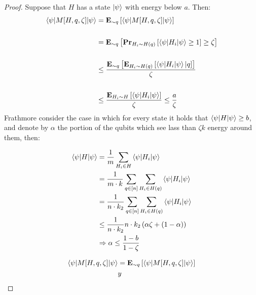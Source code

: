 \documentclass[manuscript,screen,review]{acmart}
\begin{document}
\begin{proof}
  Suppose that $H$ has a state $\ket{\psi}$ with energy below $a$. Then:  
  \begin{equation*}
    \begin{split}
      \braket{\psi|M[H,q,\zeta]|\psi} & =  \exppm{ \braket{\psi|M[H,q,\zeta]|\psi} }{\sim q} \\ 
      & \\
      & =\exppm{\prbm{ \braket{\psi|H_{i}|\psi} \ge 1 }{H_{i}\sim H(q)} \ge \zeta }{\sim q} \\
      & \\ 
      & \le  \frac{ \exppm{ \exppm{ \braket{\psi|H_{i}|\psi} | q }{ H_{i} \sim H(q)} }{ \sim q }  }{\zeta } \\
      & \\ 
      & \le  \frac{ \exppm{ \braket{\psi|H_{i}|\psi} }{ H_{i} \sim H }  }{\zeta } \le \frac{a}{\zeta}
    \end{split}
  \end{equation*}
  Frathmore consider the case in which for every state it holds that $\braket{\psi|H|\psi}\ge b$, and denote by $\alpha$ the portion of the qubits which see lass than $\zeta k$ energy around them, then: 

  \begin{equation*}
    \begin{split}
    \braket{\psi|H|\psi}  & =  \frac{1}{m}\sum_{H_{i} \in H} {\braket{\psi|H_{i}|\psi} }  \\
    & = \frac{1}{m\cdot k}\sum_{q \in [n]}\sum_{H_{i} \in H(q)} {\braket{\psi|H_{i}|\psi} }  \\
    & = \frac{1}{n \cdot k_{2}}\sum_{q \in [n]}\sum_{H_{i} \in H(q)} {\braket{\psi|H_{i}|\psi} }  \\
    & \le \frac{1}{n \cdot k_{2}} n \cdot k_{2}\left( \alpha \zeta + (1-\alpha) \right) \\
    & \Rightarrow \alpha  \le \frac{1  - b} { 1 -\zeta}
    \end{split}
  \end{equation*}

 \begin{equation*}
    \begin{split}
      \braket{\psi|M[H,q,\zeta]|\psi} & =  \exppm{ \braket{\psi|M[H,q,\zeta]|\psi} }{\sim q} \\ 
      & y
     \end{split}
  \end{equation*}
 

\end{proof}
\end{document}

